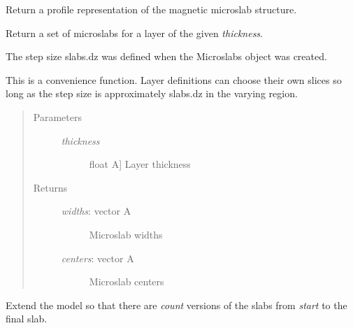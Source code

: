 \documentclass[letterpaper,10pt,english]{sphinxmanual}
\begin{document}
\begin{fulllineitems}

\begin{fulllineitems}
\label{api/profile:refl1d.profile.Microslabs.magnetic_profile}
Return a profile representation of the magnetic microslab structure.

\end{fulllineitems}


\begin{fulllineitems}
\label{api/profile:refl1d.profile.Microslabs.microslabs}
Return a set of microslabs for a layer of the given \emph{thickness}.

The step size slabs.dz was defined when the Microslabs
object was created.

This is a convenience function.  Layer definitions can choose
their own slices so long as the step size is approximately
slabs.dz in the varying region.
\begin{quote}\begin{description}
\item[{Parameters }] \leavevmode\begin{description}
\item[{\emph{thickness}}] \leavevmode{[}float \textbar{} A{]}
Layer thickness

\end{description}

\item[{Returns }] \leavevmode\begin{description}
\item[{\emph{widths}: vector \textbar{} A}] \leavevmode
Microslab widths

\item[{\emph{centers}: vector \textbar{} A}] \leavevmode
Microslab centers

\end{description}

\end{description}\end{quote}

\end{fulllineitems}


\begin{fulllineitems}
\label{api/profile:refl1d.profile.Microslabs.repeat}
Extend the model so that there are \emph{count} versions of the slabs
from \emph{start} to the final slab.


\end{fulllineitems}
\end{fulllineitems}
\end{document}

